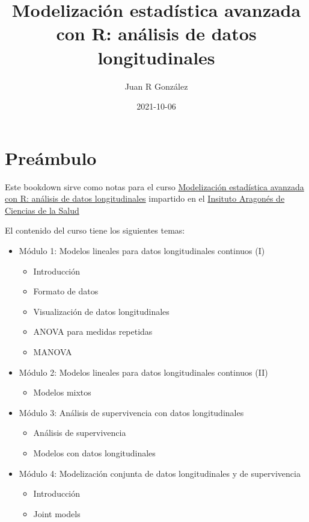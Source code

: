 \documentclass[
]{book}
\title{Modelización estadística avanzada con R: análisis de datos longitudinales}
\author{Juan R González}
\date{2021-10-06}
\providecommand{\tightlist}{%
  \setlength{\itemsep}{0pt}\setlength{\parskip}{0pt}}
\begin{document}
\maketitle

{
\setcounter{tocdepth}{1}
\tableofcontents
}
\hypertarget{preuxe1mbulo}{%
\chapter{Preámbulo}\label{preuxe1mbulo}}

Este bookdown sirve como notas para el curso \href{https://www.iisaragon.es/event/curso-modelizacion-estadistica-avanzada-con-r-analisis-de-datos-longitudinales-iacs/}{Modelización estadística avanzada con R: análisis de datos longitudinales} impartido en el \href{https://www.iacs.es/}{Insituto Aragonés de Ciencias de la Salud}

El contenido del curso tiene los siguientes temas:

\begin{itemize}
\tightlist
\item
  Módulo 1: Modelos lineales para datos longitudinales continuos (I)

  \begin{itemize}
  \tightlist
  \item
    Introducción
  \item
    Formato de datos
  \item
    Visualización de datos longitudinales
  \item
    ANOVA para medidas repetidas
  \item
    MANOVA
  \end{itemize}
\item
  Módulo 2: Modelos lineales para datos longitudinales continuos (II)

  \begin{itemize}
  \tightlist
  \item
    Modelos mixtos
  \end{itemize}
\item
  Módulo 3: Análisis de supervivencia con datos longitudinales

  \begin{itemize}
  \tightlist
  \item
    Análisis de supervivencia
  \item
    Modelos con datos longitudinales
  \end{itemize}
\item
  Módulo 4: Modelización conjunta de datos longitudinales y de supervivencia

  \begin{itemize}
  \tightlist
  \item
    Introducción
  \item
    Joint models
  \end{itemize}
\end{itemize}
\end{document}

